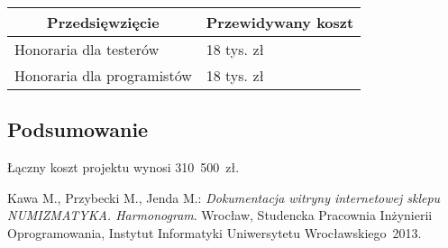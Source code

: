 \documentclass [11pt, a4paper, leqno]	{article}	%
\begin{document}
\begin{center}
	\begin{tabular}{| l | l |}
		\hline
		\multicolumn{1}{|c|}{Przedsięwzięcie} & 
		\multicolumn{1}{|c|}{Przewidywany koszt} \\ \hline \hline
		Honoraria dla testerów & 18 tys. zł \\ \hline
		Honoraria dla programistów & 18 tys. zł \\ \hline
	\end{tabular}
\end{center}

\subsection{Podsumowanie}
\noindent
Łączny koszt projektu wynosi \mbox{310\\\ 500 zł.} \\


\newpage
{}
\begin{thebibliography}{2}
	 Kawa M., Przybecki M., Jenda M.: \emph{Dokumentacja witryny internetowej sklepu NUMIZMATYKA. Harmonogram}. Wrocław, Studencka Pracownia Inżynierii Oprogramowania, Instytut Informatyki Uniwersytetu Wrocławskiego~2013.
\end{thebibliography}
\end{document}
